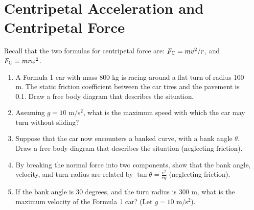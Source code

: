 \documentclass[10pt]{article}
\begin{document}
\section{Centripetal Acceleration and Centripetal Force}
Recall that the two formulas for centripetal force are: $F_{\rm C} = mv^2/r$, and $F_{\rm C} = mr\omega^2$.
\begin{enumerate}
\item A Formula 1 car with mass 800 kg is racing around a flat turn of radius 100 m.  The static friction coefficient between the car tires and the pavement is 0.1.  Draw a free body diagram that describes the situation. \\ \vspace{2cm}
\item Assuming $g = 10$ m/s$^2$, what is the maximum speed with which the car may turn without sliding? \\ \vspace{2cm} 
\item Suppose that the car now encounters a banked curve, with a bank angle $\theta$.  Draw a free body diagram that describes the situation (neglecting friction). \\ \vspace{2cm}
\item By breaking the normal force into two components, show that the bank angle, velocity, and turn radius are related by $\tan\theta = \frac{v^2}{rg}$ (neglecting friction). \\ \vspace{2cm}
\item If the bank angle is 30 degrees, and the turn radius is 300 m, what is the maximum velocity of the Formula 1 car?  (Let $g = 10$ m/s$^2$). \\ \vspace{2cm}
\end{enumerate}
\end{document}
